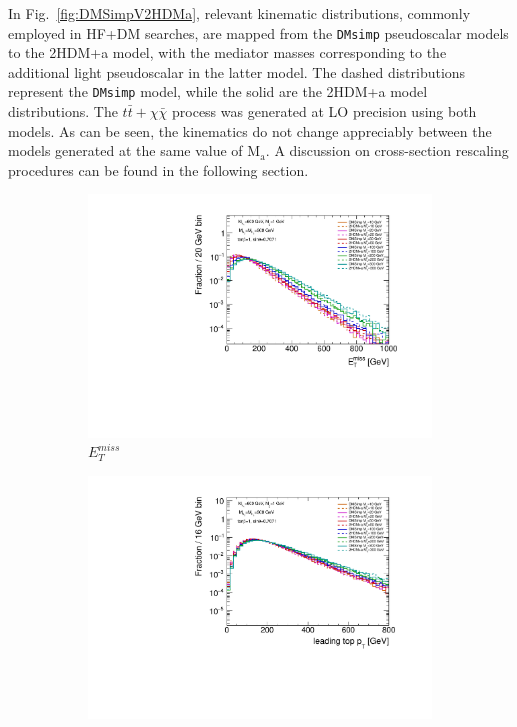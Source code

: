 In Fig.~\ref{fig:DMSimpV2HDMa}, relevant kinematic distributions, commonly employed in HF+DM searches, are mapped from the \texttt{DMsimp} pseudoscalar models to the 2HDM+a model, with the mediator masses corresponding to the additional light pseudoscalar in the latter model. The dashed distributions represent the \texttt{DMsimp} model, while the solid are the 2HDM+a model distributions. The $t\bar{t}+\chi\bar{\chi}$ process was generated at LO precision using both models. As can be seen, the kinematics do not change appreciably between the models generated at the same value of $\mathrm{M_{a}}$. A discussion on cross-section rescaling procedures can be found in the following section.

\begin{figure}
  \centering    
  \begin{subfigure}[b]{0.49\textwidth}
    \includegraphics[width=\textwidth]{texinputs/04_grid/figures/DMHF/benchmarking/MDM_1_MA_600_sinp_0.7071_tanb_1.0_DMsimpV2HDMa/metlog.pdf}
    \caption{$E_{T}^{miss}$}
  \end{subfigure}
  \begin{subfigure}[b]{0.49\textwidth}
    \includegraphics[width=\textwidth]{texinputs/04_grid/figures/DMHF/benchmarking/MDM_1_MA_600_sinp_0.7071_tanb_1.0_DMsimpV2HDMa/top1ptlog.pdf}

\end{subfigure}
\end{figure}
